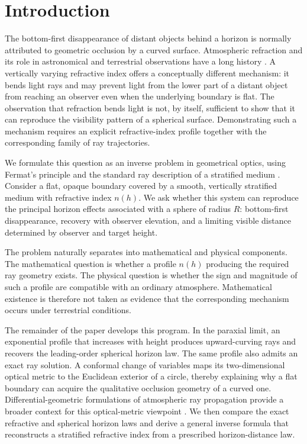 \section{Introduction}
\label{sec:introduction}

The bottom-first disappearance of distant objects behind a horizon is normally
attributed to geometric occlusion by a curved surface. Atmospheric refraction
and its role in astronomical and terrestrial observations have a long history
\cite{lehn2005history,schroeder2000astronomical}. A vertically varying
refractive index offers a conceptually different mechanism: it bends light
rays and may prevent light from the lower part of a distant object from
reaching an observer even when the underlying boundary is flat. The observation
that refraction bends light is not, by itself, sufficient to show that it can
reproduce the visibility pattern of a spherical surface. Demonstrating such a
mechanism requires an explicit refractive-index profile together with the
corresponding family of ray trajectories.

We formulate this question as an inverse problem in geometrical optics, using
Fermat's principle and the standard ray description of a stratified medium
\cite{born1999principles,schroeder2000astronomical}. Consider a flat, opaque
boundary covered by a smooth, vertically stratified medium with refractive
index $n(h)$. We ask whether this system can reproduce the principal horizon
effects associated with a sphere of radius $R$: bottom-first disappearance,
recovery with observer elevation, and a limiting visible distance determined
by observer and target height.

The problem naturally separates into mathematical and physical components.
The mathematical question is whether a profile $n(h)$ producing the required
ray geometry exists. The physical question is whether the sign and magnitude
of such a profile are compatible with an ordinary atmosphere. Mathematical
existence is therefore not taken as evidence that the corresponding mechanism
occurs under terrestrial conditions.

The remainder of the paper develops this program. In the paraxial limit, an
exponential profile that increases with height produces upward-curving rays and
recovers the leading-order spherical horizon law. The same profile also admits an exact ray solution. A conformal change
of variables maps its two-dimensional optical metric to the Euclidean exterior
of a circle, thereby explaining why a flat boundary can acquire the qualitative
occlusion geometry of a curved one. Differential-geometric formulations of
atmospheric ray propagation provide a broader context for this optical-metric
viewpoint \cite{kropla1992differential}. We then compare the exact refractive
and spherical horizon laws and derive a general inverse formula that
reconstructs a stratified refractive index from a prescribed horizon-distance
law.

